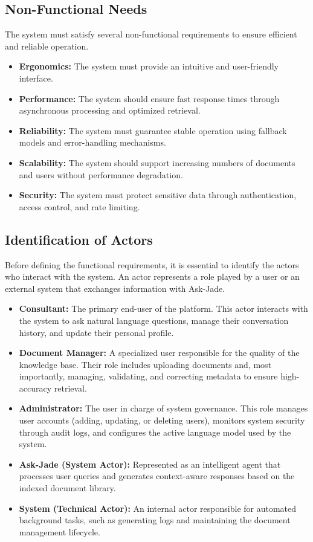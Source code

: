 \subsection{Non-Functional Needs}
The system must satisfy several non-functional requirements to ensure efficient and reliable operation.

\begin{itemize}[noitemsep, topsep=2pt]
    \item \textbf{Ergonomics:} The system must provide an intuitive and user-friendly interface.
    \item \textbf{Performance:} The system should ensure fast response times through asynchronous processing and optimized retrieval.
    \item \textbf{Reliability:} The system must guarantee stable operation using fallback models and error-handling mechanisms.
    \item \textbf{Scalability:} The system should support increasing numbers of documents and users without performance degradation.
    \item \textbf{Security:} The system must protect sensitive data through authentication, access control, and rate limiting.
\end{itemize}

\subsection{Identification of Actors}
Before defining the functional requirements, it is essential to identify the actors who interact with the system. An actor represents a role played by a user or an external system that exchanges information with Ask-Jade.

\begin{itemize}[noitemsep, topsep=2pt]
    \item \textbf{Consultant:} The primary end-user of the platform. This actor interacts with the system to ask natural language questions, manage their conversation history, and update their personal profile.
    \item \textbf{Document Manager:} A specialized user responsible for the quality of the knowledge base. Their role includes uploading documents and, most importantly, managing, validating, and correcting metadata to ensure high-accuracy retrieval.
    \item \textbf{Administrator:} The user in charge of system governance. This role manages user accounts (adding, updating, or deleting users), monitors system security through audit logs, and configures the active language model used by the system.
    \item \textbf{Ask-Jade (System Actor):} Represented as an intelligent agent that processes user queries and generates context-aware responses based on the indexed document library.
    \item \textbf{System (Technical Actor):} An internal actor responsible for automated background tasks, such as generating logs and maintaining the document management lifecycle.
\end{itemize}

